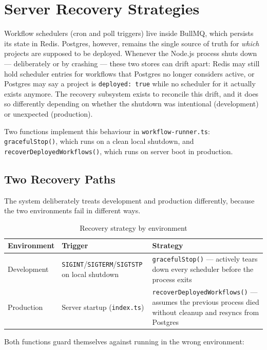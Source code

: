 \section{Server Recovery Strategies}
\label{sec:server-recovery}

Workflow schedulers (cron and poll triggers) live inside BullMQ, which persists its state in Redis. Postgres, however, remains the single 
source of truth for \emph{which} projects are supposed to be deployed. Whenever the Node.js process shuts down — deliberately or by 
crashing — these two stores can drift apart: Redis may still hold scheduler entries for workflows that Postgres no longer considers active, 
or Postgres may say a project is \texttt{deployed: true} while no scheduler for it actually exists anymore. The recovery subsystem exists 
to reconcile this drift, and it does so differently depending on whether the shutdown was intentional (development) or unexpected 
(production).

Two functions implement this behaviour in \texttt{workflow-runner.ts}: \texttt{gracefulStop()}, which runs on a clean local shutdown, 
and \texttt{recoverDeployedWorkflows()}, which runs on server boot in production.

\subsection{Two Recovery Paths}

The system deliberately treats development and production differently, because the two environments fail in different ways.

\begin{table}[H]
\centering
\caption{Recovery strategy by environment}
\label{tab:recovery-strategy}
\begin{tabular}{|p{2.8cm}|p{5.2cm}|p{5cm}|}
\hline
\textbf{Environment} & \textbf{Trigger} & \textbf{Strategy} \\
\hline
Development & \texttt{SIGINT}/\texttt{SIGTERM}/\texttt{SIGTSTP} on local shutdown & \texttt{gracefulStop()} — actively tears down every 
scheduler before the process exits \\
\hline
Production & Server startup (\texttt{index.ts}) & \texttt{recoverDeployedWorkflows()} — assumes the previous process died without cleanup 
and resyncs from Postgres \\
\hline
\end{tabular}
\end{table}

Both functions guard themselves against running in the wrong environment:

